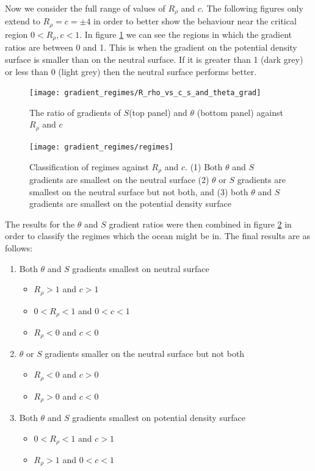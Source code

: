 Now we consider the full range of values of $R_\rho$ and $c$. The following figures only extend to $R_\rho = c = \pm 4$ in order to better show the behaviour near the critical region $0<R_\rho, c<1$. In figure \ref{fig:gradient_results_r_rho_vs_c_both_gradients} we can see the regions in which the gradient ratios are between 0 and 1. This is when the gradient on the potential density surface is smaller than on the neutral surface. If it is greater than 1 (dark grey) or less than 0 (light grey) then the neutral surface performs better.

\begin{figure}[htbp]
    \centering
    \texttt{[image: gradient\_regimes/R\_rho\_vs\_c\_s\_and\_theta\_grad]}
    \caption{The ratio of gradients of $S$(top panel) and $\theta$ (bottom panel) against $R_\rho$ and $c$}
    \label{fig:gradient_results_r_rho_vs_c_both_gradients}
\end{figure}

\begin{figure}[htbp]
    \centering
    \texttt{[image: gradient\_regimes/regimes]}
    \caption{Classification of regimes against $R_\rho$ and $c$. (1) Both $\theta$ and $S$ gradients are smallest on the neutral surface (2) $\theta$ or $S$ gradients are smallest on the neutral surface but not both, and (3) both $\theta$ and $S$ gradients are smallest on the potential density surface}
    \label{fig:gradient_results_regimes}
\end{figure}

The results for the $\theta$ and $S$ gradient ratios were then combined in figure \ref{fig:gradient_results_regimes} in order to classify the regimes which the ocean might be in. The final results are as follows:
\begin{enumerate}
    \item Both $\theta$ and $S$ gradients smallest on neutral surface
        \begin{itemize}
            \item $R_\rho>1$ and $c>1$ 
            \item $0<R_\rho<1$ and $0<c<1$
            \item $R_\rho<0$ and $c<0$
        \end{itemize}
    \item $\theta$ or $S$ gradients smaller on the neutral surface but not both
         \begin{itemize}
            \item $R_\rho<0$ and $c>0$
            \item $R_\rho>0$ and $c<0$
        \end{itemize}
    \item Both $\theta$ and $S$ gradients smallest on potential density surface
         \begin{itemize}
            \item $0<R_\rho<1$ and $c>1$
            \item $R_\rho>1$ and $0<c<1$
        \end{itemize}
\end{enumerate}

